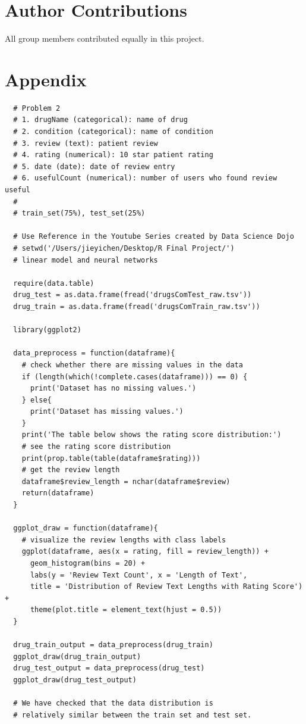 \documentclass{article}
\begin{document}
\section{Author Contributions}
All group members contributed equally in this project.

\section{Appendix}
\begin{verbatim}
  # Problem 2
  # 1. drugName (categorical): name of drug 
  # 2. condition (categorical): name of condition 
  # 3. review (text): patient review 
  # 4. rating (numerical): 10 star patient rating 
  # 5. date (date): date of review entry 
  # 6. usefulCount (numerical): number of users who found review useful
  # 
  # train_set(75%), test_set(25%)

  # Use Reference in the Youtube Series created by Data Science Dojo
  # setwd('/Users/jieyichen/Desktop/R Final Project/')
  # linear model and neural networks

  require(data.table)
  drug_test = as.data.frame(fread('drugsComTest_raw.tsv'))
  drug_train = as.data.frame(fread('drugsComTrain_raw.tsv'))

  library(ggplot2)

  data_preprocess = function(dataframe){
    # check whether there are missing values in the data
    if (length(which(!complete.cases(dataframe))) == 0) {
      print('Dataset has no missing values.')
    } else{
      print('Dataset has missing values.')
    }
    print('The table below shows the rating score distribution:')
    # see the rating score distribution
    print(prop.table(table(dataframe$rating)))
    # get the review length
    dataframe$review_length = nchar(dataframe$review)
    return(dataframe)
  }

  ggplot_draw = function(dataframe){
    # visualize the review lengths with class labels
    ggplot(dataframe, aes(x = rating, fill = review_length)) + 
      geom_histogram(bins = 20) + 
      labs(y = 'Review Text Count', x = 'Length of Text', 
      title = 'Distribution of Review Text Lengths with Rating Score') +
      theme(plot.title = element_text(hjust = 0.5))
  }

  drug_train_output = data_preprocess(drug_train)
  ggplot_draw(drug_train_output)
  drug_test_output = data_preprocess(drug_test)
  ggplot_draw(drug_test_output)

  # We have checked that the data distribution is 
  # relatively similar between the train set and test set.



\end{verbatim}
\end{document}
